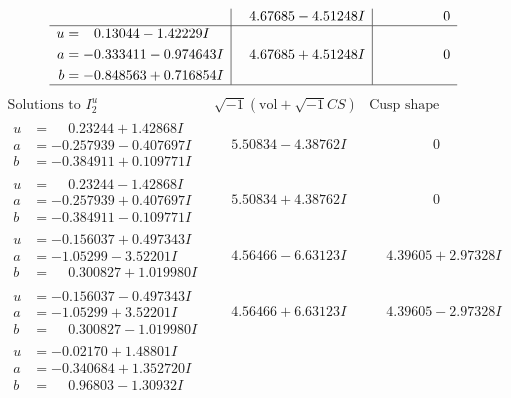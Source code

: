 \documentclass[1p]{elsarticle_modified}
\theoremstyle{definition}
\newcommand{\I}{\sqrt{-1}}
\begin{document}
$$\begin{array}{c|c|c}
 & \phantom{-}4.67685 - 4.51248 I & \phantom{-0.000000 } 0 \\ \hline\begin{aligned}
u &= \phantom{-}0.13044 - 1.42229 I \\
a &= -0.333411 - 0.974643 I \\
b &= -0.848563 + 0.716854 I\end{aligned}
 & \phantom{-}4.67685 + 4.51248 I & \phantom{-0.000000 } 0\\
 \hline 
 \end{array}$$\newpage$$\begin{array}{c|c|c}  
\text{Solutions to }I^u_{2}& \I (\text{vol} + \sqrt{-1}CS) & \text{Cusp shape}\\
 \hline 
\begin{aligned}
u &= \phantom{-}0.23244 + 1.42868 I \\
a &= -0.257939 - 0.407697 I \\
b &= -0.384911 + 0.109771 I\end{aligned}
 & \phantom{-}5.50834 - 4.38762 I & \phantom{-0.000000 } 0 \\ \hline\begin{aligned}
u &= \phantom{-}0.23244 - 1.42868 I \\
a &= -0.257939 + 0.407697 I \\
b &= -0.384911 - 0.109771 I\end{aligned}
 & \phantom{-}5.50834 + 4.38762 I & \phantom{-0.000000 } 0 \\ \hline\begin{aligned}
u &= -0.156037 + 0.497343 I \\
a &= -1.05299 - 3.52201 I \\
b &= \phantom{-}0.300827 + 1.019980 I\end{aligned}
 & \phantom{-}4.56466 - 6.63123 I & \phantom{-}4.39605 + 2.97328 I \\ \hline\begin{aligned}
u &= -0.156037 - 0.497343 I \\
a &= -1.05299 + 3.52201 I \\
b &= \phantom{-}0.300827 - 1.019980 I\end{aligned}
 & \phantom{-}4.56466 + 6.63123 I & \phantom{-}4.39605 - 2.97328 I \\ \hline\begin{aligned}
u &= -0.02170 + 1.48801 I \\
a &= -0.340684 + 1.352720 I \\
b &= \phantom{-}0.96803 - 1.30932 I\end{aligned}

\end{array}$$
\end{document}
